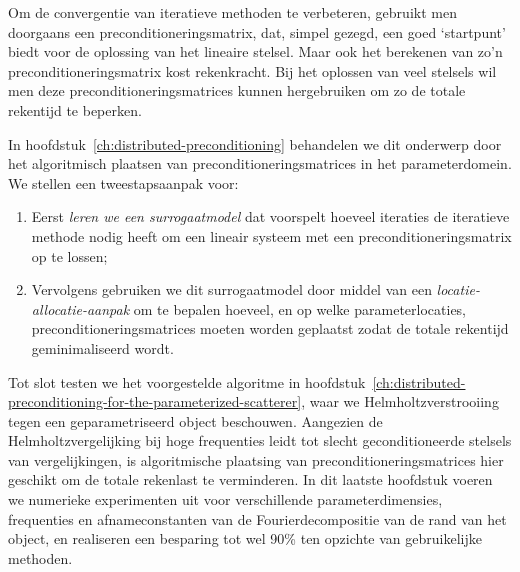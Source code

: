 Om de convergentie van iteratieve methoden te verbeteren, gebruikt men doorgaans een preconditioneringsmatrix, dat, simpel gezegd, een goed ‘startpunt’ biedt voor de oplossing van het lineaire stelsel.
Maar ook het berekenen van zo’n preconditioneringsmatrix kost rekenkracht.
Bij het oplossen van veel stelsels wil men deze preconditioneringsmatrices kunnen hergebruiken om zo de totale rekentijd te beperken.

In hoofdstuk~\ref{ch:distributed-preconditioning} behandelen we dit onderwerp door het algoritmisch plaatsen van preconditioneringsmatrices in het parameterdomein.
We stellen een tweestapsaanpak voor:
\begin{enumerate}
    \item Eerst \emph{leren we een surrogaatmodel} dat voorspelt hoeveel iteraties de iteratieve methode nodig heeft om een lineair systeem met een preconditioneringsmatrix op te lossen;
    \item Vervolgens gebruiken we dit surrogaatmodel door middel van een \emph{locatie-allocatie-aanpak} om te bepalen hoeveel, en op welke parameterlocaties, preconditioneringsmatrices moeten worden geplaatst zodat de totale rekentijd geminimaliseerd wordt.
\end{enumerate}

Tot slot testen we het voorgestelde algoritme in hoofdstuk~\ref{ch:distributed-preconditioning-for-the-parameterized-scatterer}, waar we Helmholtzverstrooiing tegen een geparametriseerd object beschouwen.
Aangezien de Helmholtzvergelijking bij hoge frequenties leidt tot slecht geconditioneerde stelsels van vergelijkingen, is algoritmische plaatsing van preconditioneringsmatrices hier geschikt om de totale rekenlast te verminderen.
In dit laatste hoofdstuk voeren we numerieke experimenten uit voor verschillende parameterdimensies, frequenties en afnameconstanten van de Fourierdecompositie van de rand van het object, en realiseren een besparing tot wel 90\% ten opzichte van gebruikelijke methoden.
